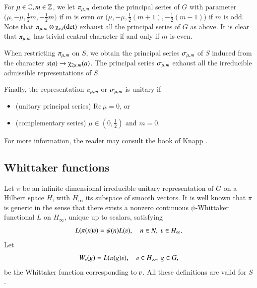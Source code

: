 \documentclass{amsproc}
\newcommand{\BC}{{\mathbb {C}}} \newcommand{\BD}{{\mathbb {D}}}
\newcommand{\ra}{\rightarrow}
\def\lp {\left (}
\def\rp {\right )}
\renewcommand{\Re}{{\mathrm{Re}\,}}
\def\shskip{\hskip 0.5 pt}
\newcommand{\CW}{{\mathcal {W}}}
\theoremstyle{plain}
\numberwithin{equation}{section}
\begin{document}
For $\mu\in \BC, m\in \BZ$, we let $ \pi_{\mu,\shskip m}$ denote the principal series   of $G$ with parameter $\big(\mu, - \mu, \frac 1 2 m, - \frac 1 2 m \big)$ if $m$ is even or $ \big(\mu, - \mu, \frac 1 2 (m+1), - \frac 1 2 (m-1) \big) $ if $m$ is odd. Note that $\pi_{\mu, \shskip  m} \otimes \chiup_{\nu,\shskip   l} (\det)$ exhaust all the principal series of $G$   as above. It is clear that $\pi_{\mu, \shskip  m}$ has trivial central character if and only if $m$ is even. %


When restricting $\pi_{\mu, \shskip  m}$ on $S$, we obtain the principal series $\sigma_{\mu,\shskip m}$ of $S$ induced from the character $s(a) \ra \chiup_{ 2 \mu,\shskip  m} (a) $. The principal series $\sigma_{\mu,\shskip m}$ exhaust all  the irreducible admissible representations of $S$.





Finally, the representation $\pi_{\mu, \shskip  m}$ or $\sigma_{\mu, \shskip  m}$ is unitary if
\begin{itemize}
	\item[-] (unitary principal series) $\Re \mu = 0$, or
	\item[-] (complementary series) $\mu   \in %
	\lp 0, \frac 1 2\rp$ and $ m = 0$.
\end{itemize}
For more information, the reader may consult the book of Knapp \cite{Knapp-Book}.


\subsection{Whittaker functions}

	Let $\pi$ be an infinite dimensional irreducible unitary
representation of $G$  on a Hilbert space $H$, with $H_\infty$ its subspace of smooth vectors. It is well known that $\pi$ is generic in the sense that
there exists a  nonzero continuous $\psi$-Whittaker
functional $L$ on $H_\infty$, unique up to scalars, satisfying
\begin{equation*}
L (\pi(n )\varv)=\psi(n )L(\varv), \hskip 10 pt n \in N, \   \varv\in H_\infty.
\end{equation*}
Let
\begin{equation}\label{def: Wv(g)}
W_\varv(g)=L(\pi(g)\varv), \hskip 10 pt  \varv\in H_\infty, \  g\in G,
\end{equation}
be the Whittaker function corresponding to $\varv$. %
All these definitions are valid for  $S$.
\end{document}
